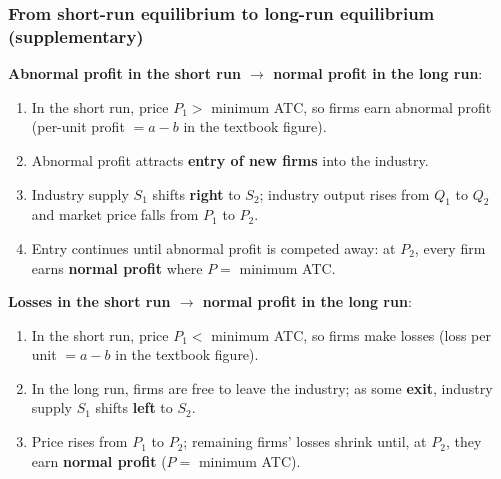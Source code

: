 \subsubsection*{From short-run equilibrium to long-run equilibrium (supplementary)}
\textbf{Abnormal profit in the short run $\to$ normal profit in the long run}:
\begin{enumerate}
  \item In the short run, price $P_1 >$ minimum ATC, so firms earn abnormal profit (per-unit profit $= a - b$ in the textbook figure).
  \item Abnormal profit attracts \textbf{entry of new firms} into the industry.
  \item Industry supply $S_1$ shifts \textbf{right} to $S_2$; industry output rises from $Q_1$ to $Q_2$ and market price falls from $P_1$ to $P_2$.
  \item Entry continues until abnormal profit is competed away: at $P_2$, every firm earns \textbf{normal profit} where $P = $ minimum ATC.
\end{enumerate}
\textbf{Losses in the short run $\to$ normal profit in the long run}:
\begin{enumerate}
  \item In the short run, price $P_1 <$ minimum ATC, so firms make losses (loss per unit $= a - b$ in the textbook figure).
  \item In the long run, firms are free to leave the industry; as some \textbf{exit}, industry supply $S_1$ shifts \textbf{left} to $S_2$.
  \item Price rises from $P_1$ to $P_2$; remaining firms' losses shrink until, at $P_2$, they earn \textbf{normal profit} ($P = $ minimum ATC).
\end{enumerate}
